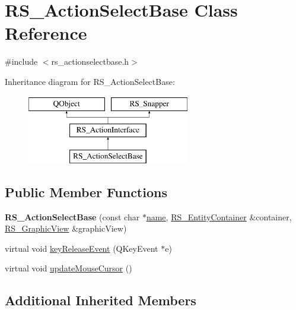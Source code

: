 \hypertarget{classRS__ActionSelectBase}{\section{R\-S\-\_\-\-Action\-Select\-Base Class Reference}
\label{classRS__ActionSelectBase}
}


{\ttfamily \#include $<$rs\-\_\-actionselectbase.\-h$>$}

Inheritance diagram for R\-S\-\_\-\-Action\-Select\-Base\-:\begin{figure}[H]
\begin{center}
\leavevmode
\includegraphics[height=3.000000cm]{classRS__ActionSelectBase}
\end{center}
\end{figure}
\subsection*{Public Member Functions}
\begin{DoxyCompactItemize}
\item 
\hypertarget{classRS__ActionSelectBase_ad20e2f4959377fd34da469864b884bf9}{{\bfseries R\-S\-\_\-\-Action\-Select\-Base} (const char $\ast$\hyperlink{classRS__ActionInterface_a1fdccfa2fcee3e1d21e6f79e6987f3df}{name}, \hyperlink{classRS__EntityContainer}{R\-S\-\_\-\-Entity\-Container} \&container, \hyperlink{classRS__GraphicView}{R\-S\-\_\-\-Graphic\-View} \&graphic\-View)}\label{classRS__ActionSelectBase_ad20e2f4959377fd34da469864b884bf9}

\item 
virtual void \hyperlink{classRS__ActionSelectBase_ae89489a425081c861ddb12c8ff02130d}{key\-Release\-Event} (Q\-Key\-Event $\ast$e)
\item 
virtual void \hyperlink{classRS__ActionSelectBase_a4b3a05ffbe33b39963625d50e663a5ab}{update\-Mouse\-Cursor} ()
\end{DoxyCompactItemize}
\subsection*{Additional Inherited Members}


